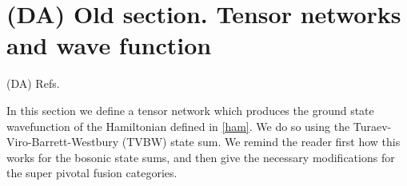 \documentclass[12pt,a4paper]{article}
\newcounter{arrow}
\newcommand{\ra}{\rightarrow}
\newcommand{\mcm}{\mathcal{M}}
\newcommand{\dave}[1]{{\color{ao(english)}\footnotesize{(DA) #1}}}
\begin{document}


 

 

\section{\dave{Old section.} Tensor networks and wave function} 
\dave{Refs.}
\cite{Turaev2010}

In this section we define a tensor network which produces the ground state wavefunction of the Hamiltonian defined in \eqref{ham}.
We do so using the Turaev-Viro-Barrett-Westbury (TVBW) state sum\cite{Turaev1992,Barrett1996}.
We remind the reader first how this works for the bosonic state sums, 
and then give the necessary modifications for the super pivotal fusion categories.
\end{document}
